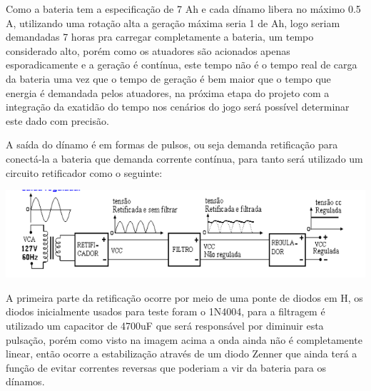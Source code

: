 Como a bateria tem a especificação de 7 Ah e cada dínamo libera no máximo 0.5 A, utilizando uma rotação alta a geração máxima seria 1 de Ah, logo seriam demandadas 7 horas pra carregar completamente a bateria, um tempo considerado alto, porém como os atuadores são acionados apenas esporadicamente e a geração é contínua, este tempo não é o tempo real de carga da bateria uma vez que o tempo de geração é bem maior que o tempo que energia é demandada pelos atuadores, na próxima etapa do projeto com a integração da exatidão do tempo nos cenários do jogo será possível determinar este dado com precisão.

A saída do dínamo é em formas de pulsos, ou seja demanda retificação para conectá-la a bateria que demanda corrente contínua, para tanto será utilizado um circuito retificador como o seguinte: 



 \begin{center}
    	\includegraphics[scale=0.7]{figuras/ret}
        \label{ret}
    \end{center}

A primeira parte da retificação ocorre por meio de uma ponte de diodos em H, os diodos inicialmente usados para teste foram o 1N4004, para a filtragem é utilizado um capacitor de 4700uF que será responsável por diminuir esta pulsação, porém como visto na imagem acima a onda ainda não é completamente linear, então ocorre a estabilização através de um diodo Zenner que ainda terá a função de evitar correntes reversas que poderiam a vir da bateria para os dínamos. 
































